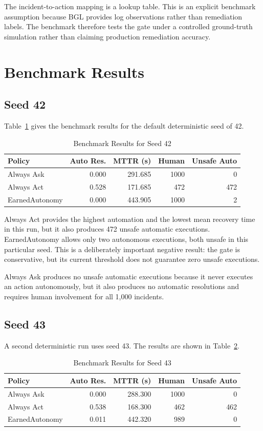 \documentclass[conference]{IEEEtran}
\begin{document}
The incident-to-action mapping is a lookup table. This is an explicit benchmark
assumption because BGL provides log observations rather than remediation
labels. The benchmark therefore tests the gate under a controlled ground-truth
simulation rather than claiming production remediation accuracy.

\section{Benchmark Results}

\subsection{Seed 42}
Table~\ref{tab:seed42} gives the benchmark results for the default deterministic
seed of 42.

\begin{table}[htbp]
\centering
\caption{Benchmark Results for Seed 42}
\label{tab:seed42}
\begin{tabular}{lrrrr}
\toprule
Policy & Auto Res. & MTTR (s) & Human & Unsafe Auto\\
\midrule
Always Ask & 0.000 & 291.685 & 1000 & 0\\
Always Act & 0.528 & 171.685 & 472 & 472\\
EarnedAutonomy & 0.000 & 443.905 & 1000 & 2\\
\bottomrule
\end{tabular}
\end{table}

Always Act provides the highest automation and the lowest mean recovery time
in this run, but it also produces 472 unsafe automatic executions. EarnedAutonomy
allows only two autonomous executions, both unsafe in this particular seed.
This is a deliberately important negative result: the gate is conservative,
but its current threshold does not guarantee zero unsafe executions.

Always Ask produces no unsafe automatic executions because it never executes
an action autonomously, but it also produces no automatic resolutions and
requires human involvement for all 1,000 incidents.

\subsection{Seed 43}
A second deterministic run uses seed 43. The results are shown in
Table~\ref{tab:seed43}.

\begin{table}[htbp]
\centering
\caption{Benchmark Results for Seed 43}
\label{tab:seed43}
\begin{tabular}{lrrrr}
\toprule
Policy & Auto Res. & MTTR (s) & Human & Unsafe Auto\\
\midrule
Always Ask & 0.000 & 288.300 & 1000 & 0\\
Always Act & 0.538 & 168.300 & 462 & 462\\
EarnedAutonomy & 0.011 & 442.320 & 989 & 0\\
\bottomrule
\end{tabular}
\end{table}
\end{document}
